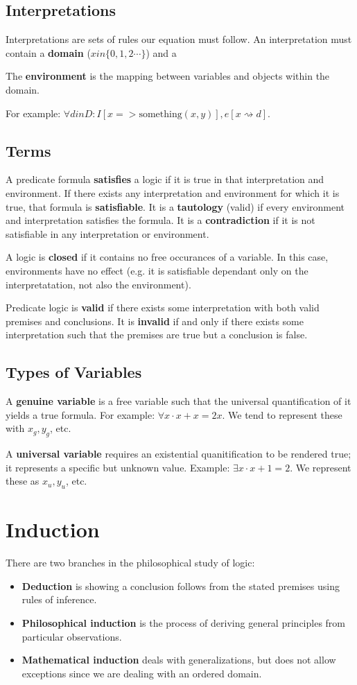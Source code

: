 \documentclass[12pt]{article}
\begin{document}
\subsection*{Interpretations}
Interpretations are sets of rules our equation must follow. An interpretation must contain a {\bf domain} ($x in \{0, 1, 2 \cdots\}$) and a

The {\bf environment} is the mapping between variables and objects within the domain.

For example: $\forall d in D : I[x => \text{something}(x,y)], e[x \rightsquigarrow d]$.

\subsection*{Terms}
A predicate formula {\bf satisfies} a logic if it is true in that interpretation and environment. If there exists any interpretation and environment for which it is true, that formula is {\bf satisfiable}. It is a {\bf tautology} (valid) if every environment and interpretation satisfies the formula. It is a {\bf contradiction} if it is not satisfiable in any interpretation or environment.

A logic is {\bf closed} if it contains no free occurances of a variable. In this case, environments have no effect (e.g. it is satisfiable dependant only on the interpretatation, not also the environment).

Predicate logic is {\bf valid} if there exists some interpretation with both valid premises and conclusions. It is {\bf invalid} if and only if there exists some interpretation such that the premises are true but a conclusion is false.

\subsection*{Types of Variables}
A {\bf genuine variable} is a free variable such that the universal quantification of it yields a true formula. For example: $\forall x \cdot x + x = 2x$. We tend to represent these with $x_g, y_g$, etc.

A {\bf universal variable} requires an existential quanitification to be rendered true; it represents a specific but unknown value. Example: $\exists x \cdot x + 1 = 2$. We represent these as $x_u, y_u$, etc.

\section*{Induction}
There are two branches in the philosophical study of logic:
\begin{itemize}
\item {\bf Deduction} is showing a conclusion follows from the stated premises using rules of inference.
\item {\bf Philosophical induction} is the process of deriving general principles from particular observations.
\item {\bf Mathematical induction} deals with generalizations, but does not allow exceptions since we are dealing with an ordered domain.
\end{itemize}
\end{document}
